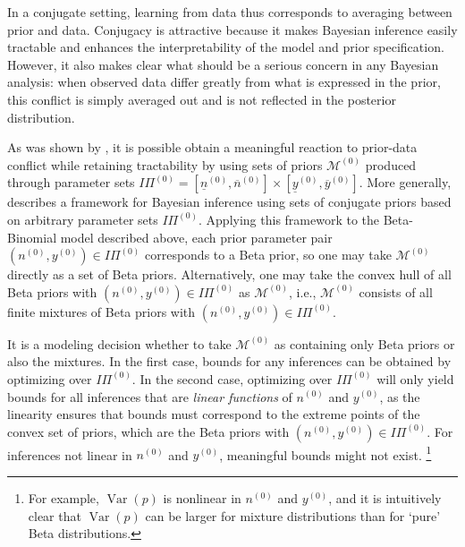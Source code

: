 \documentclass[runningheads,a4paper]{llncs}
\newcommand{\uz}{^{(0)}} %
\newcommand{\ul}[1]{\underline{#1}}
\newcommand{\ol}[1]{\overline{#1}}
\def\yz{y\uz}
\def\yzl{\ul{y}\uz}
\def\yzu{\ol{y}\uz}
\def\nz{n\uz}
\def\nzl{\ul{n}\uz}
\def\nzu{\ol{n}\uz}
\def\PZ{I\!\!\Pi\uz}
\def\MZ{\mathcal{M}\uz}
\newcommand{\V}{\operatorname{Var}}
\begin{document}
In a conjugate setting, learning from data thus corresponds to averaging between prior and data.
Conjugacy is attractive because it makes Bayesian inference easily tractable
and enhances the interpretability of the model and prior specification.
However, it also makes clear what should be a serious concern in any Bayesian analysis:
when observed data differ greatly from what is expressed in the prior,
this conflict is simply averaged out
and is not reflected in the posterior distribution.


As was shown by \cite{Walter2009a}, %
it is possible obtain a meaningful reaction to prior-data conflict while retaining tractability
by using sets of priors $\MZ$ produced through parameter sets $\PZ = [\nzl, \nzu] \times [\yzl, \yzu]$.
More generally, \cite[\S 3.1]{2013:diss-gw} describes a framework for
Bayesian inference using sets of conjugate priors based on arbitrary parameter sets $\PZ$.
Applying this framework to the Beta-Binomial model described above,
each prior parameter pair $(\nz, \yz) \in \PZ$ corresponds to a Beta prior,
so one may take $\MZ$ directly as a set of Beta priors.
Alternatively, one may take the convex hull of all Beta priors with $(\nz, \yz) \in \PZ$ as $\MZ$,
i.e., $\MZ$ consists of all finite mixtures of Beta priors with $(\nz, \yz) \in \PZ$.

It is a modeling decision whether to take $\MZ$ as containing only Beta priors or also the mixtures.
In the first case, bounds for any inferences can be obtained by optimizing over $\PZ$.
In the second case, optimizing over $\PZ$ will only yield bounds for all inferences
that are \emph{linear functions} of $\nz$ and $\yz$,
as the linearity ensures that bounds must correspond to the extreme points of the convex set of priors,
which are the Beta priors with $(\nz, \yz) \in \PZ$.
For inferences not linear in $\nz$ and $\yz$, meaningful bounds might not exist.%
\footnote{For example, $\V(p)$ is nonlinear in $\nz$ and $\yz$,
and it is intuitively clear that $\V(p)$ can be larger for mixture distributions than for `pure' Beta distributions.}
\end{document}
